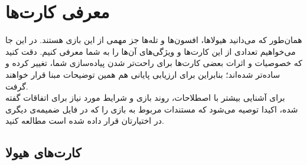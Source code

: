 \documentclass[]{article}
\begin{document}
\section*{{\titr معرفی کارت‌ها }}
همان‌طور که می‌دانید هیولاها، افسون‌ها و تله‌ها جز مهمی از این بازی هستند. در این جا می‌خواهیم تعدادی
از این کارت‌ها و ویژگی‌های آن‌ها را به شما معرفی کنیم.
دقت کنید که خصوصیات و اثرات بعضی کارت‌ها برای راحت‌تر شدن پیاده‌سازی شما، تغییر کرده و ساده‌تر شده‌اند؛ 
بنابراین برای ارزیابی پایانی هم همین توضیحات مبنا قرار خواهند گرفت. \\
برای آشنایی بیشتر با اصطلاحات، روند بازی و شرایط مورد نیاز برای اتفاقات گفته شده، اکیدا توصیه می‌شود که
 مستندات مربوط به بازی را که در فایل ضمیمه‌ی دیگری در اختیارتان قرار داده شده است مطالعه کنید.










\newcommand{\spell}[5]{
	\begin{tcolorbox}[adjusted title=\lr{#1}]
		\texttt{[image: \#2]}
		
		افسون یا تله: #3
		
		نوع: #4
		
		\tcblower
		
		#5
		
	\end{tcolorbox}
	
}


\newcommand{\monster}[7]{
	\begin{tcolorbox}[adjusted title=\lr{#1}]
		\texttt{[image: \#2]}
		
		نوع هیولا: \lr{#3} \quad سطح: {#4}
		
		قدرت حمله: #5 \quad قدرت دفاع: #6
		\tcblower
		
		#7
		
	\end{tcolorbox}
	
}





\subsection*{{\titr کارت‌های هیولا}}
\end{document}
